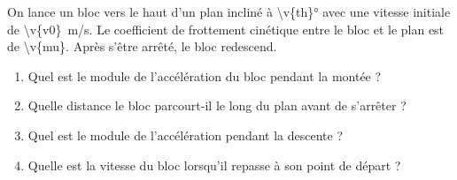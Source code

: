 On lance un bloc vers le haut d'un plan incliné à \ang{\v{th}} avec une vitesse initiale de \qty{\v{v0}}{m/s}. Le coefficient de frottement cinétique entre le bloc et le plan est de \num{\v{mu}}. Après s'être arrêté, le bloc redescend.

\begin{enumerate}[label=\alph*)]
    \item Quel est le module de l'accélération du bloc pendant la montée ?
    \item Quelle distance le bloc parcourt-il le long du plan avant de s'arrêter ?
    \item Quel est le module de l'accélération pendant la descente ?
    \item Quelle est la vitesse du bloc lorsqu'il repasse à son point de départ ?
\end{enumerate}
